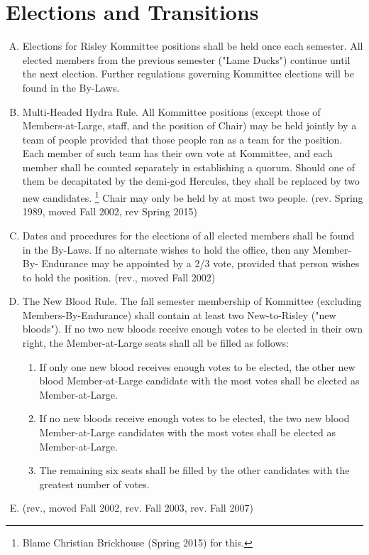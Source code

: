 \documentclass[12pt]{article}
\begin{document}
\section{Elections and Transitions}
\begin{enumerate}[A.]
\item Elections for Risley Kommittee positions shall be held once each semester. All elected members from the previous semester ("Lame Ducks") continue until the next election. Further regulations governing Kommittee elections will be found in the By-Laws.
\item Multi-Headed Hydra Rule. All Kommittee positions (except those of Members-at-Large, staff, and the position of Chair) may be held jointly by a team of people provided that those people ran as a team for the position. Each member of such team has their own vote at Kommittee, and each member shall be counted separately in establishing a quorum. Should one of them be decapitated by the demi-god Hercules, they shall be replaced by two new candidates. \footnote{Blame Christian Brickhouse (Spring 2015) for this.} Chair may only be held by at most two people. (rev. Spring 1989, moved Fall 2002, rev Spring 2015)
\item Dates and procedures for the elections of all elected members shall be found in the By-Laws. If no alternate wishes to hold the office, then any Member-By- Endurance may be appointed by a 2/3 vote, provided that person wishes to hold the position. (rev., moved Fall 2002)
\item The New Blood Rule. The fall semester membership of Kommittee (excluding Members-By-Endurance) shall contain at least two New-to-Risley ("new bloods"). If no two new bloods receive enough votes to be elected in their own right, the Member-at-Large seats shall all be filled as follows:
\begin{enumerate}[1.]
\item If only one new blood receives enough votes to be elected, the other new blood Member-at-Large candidate with the most votes shall be elected as Member-at-Large.
\item If no new bloods receive enough votes to be elected, the two new blood Member-at-Large candidates with the most votes shall be elected as Member-at-Large.
\item The remaining six seats shall be filled by the other candidates with the greatest number of votes.
\end{enumerate}
\item (rev., moved Fall 2002, rev. Fall 2003, rev. Fall 2007)

\end{enumerate}
\end{document}
